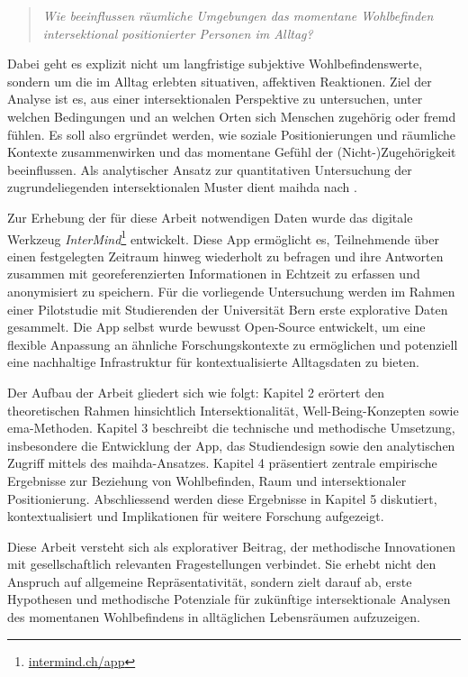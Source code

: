 \begin{quote}
\emph{Wie beeinflussen räumliche Umgebungen das momentane Wohlbefinden intersektional positionierter Personen im Alltag?}
\end{quote}

Dabei geht es explizit nicht um langfristige subjektive Wohlbefindenswerte, sondern um die im Alltag erlebten situativen, affektiven Reaktionen. Ziel der Analyse ist es, aus einer intersektionalen Perspektive zu untersuchen, unter welchen Bedingungen und an welchen Orten sich Menschen zugehörig oder fremd fühlen. Es soll also ergründet werden, wie soziale Positionierungen und räumliche Kontexte zusammenwirken und das momentane Gefühl der (Nicht-)Zugehörigkeit beeinflussen. Als analytischer Ansatz zur quantitativen Untersuchung der zugrundeliegenden intersektionalen Muster dient \gls{maihda} nach \textcite{grossModellingIntersectionalityQuantitative2023}.

Zur Erhebung der für diese Arbeit notwendigen Daten wurde das digitale Werkzeug \emph{InterMind}\footnote{\href{https://intermind.ch/app}{intermind.ch/app}} entwickelt. Diese App ermöglicht es, Teilnehmende über einen festgelegten Zeitraum hinweg wiederholt zu befragen und ihre Antworten zusammen mit georeferenzierten Informationen in Echtzeit zu erfassen und anonymisiert zu speichern. Für die vorliegende Untersuchung werden im Rahmen einer Pilotstudie mit Studierenden der Universität Bern erste explorative Daten gesammelt. Die App selbst wurde bewusst Open-Source entwickelt, um eine flexible Anpassung an ähnliche Forschungskontexte zu ermöglichen und potenziell eine nachhaltige Infrastruktur für kontextualisierte Alltagsdaten zu bieten.


Der Aufbau der Arbeit gliedert sich wie folgt: Kapitel 2 erörtert den theoretischen Rahmen hinsichtlich Intersektionalität, Well-Being-Konzepten sowie \gls{ema}-Methoden. Kapitel 3 beschreibt die technische und methodische Umsetzung, insbesondere die Entwicklung der App, das Studiendesign sowie den analytischen Zugriff mittels des \gls{maihda}-Ansatzes. Kapitel 4 präsentiert zentrale empirische Ergebnisse zur Beziehung von Wohlbefinden, Raum und intersektionaler Positionierung. Abschliessend werden diese Ergebnisse in Kapitel 5 diskutiert, kontextualisiert und Implikationen für weitere Forschung aufgezeigt.

Diese Arbeit versteht sich als explorativer Beitrag, der methodische Innovationen mit gesellschaftlich relevanten Fragestellungen verbindet. Sie erhebt nicht den Anspruch auf allgemeine Repräsentativität, sondern zielt darauf ab, erste Hypothesen und methodische Potenziale für zukünftige intersektionale Analysen des momentanen Wohlbefindens in alltäglichen Lebensräumen aufzuzeigen.